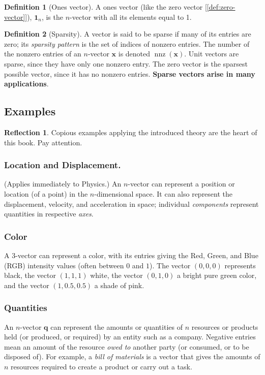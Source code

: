 \documentclass[11pt]{book}
\theoremstyle{definition}
\newtheorem{definition}{Definition}
\theoremstyle{plain}
\theoremstyle{problemstyle}
\theoremstyle{remark}
\theoremstyle{definition}
\newtheorem{reflection}{Reflection}
\DeclareMathOperator{\nnz}{nnz} %
\newcommand{\nnzx}{\nnz(\boldsymbol{x})}
\begin{document}
\begin{definition}[Ones vector]
    A ones vector (like the zero vector [\ref{def:zero-vector}]), $\boldsymbol{1}_n$, is the $n$-vector with all its elements equal to 1.
\end{definition}


\begin{definition}[Sparsity]
    A vector is said to be sparse if many of its entries are zero; its \emph{sparsity pattern} is the set of indices of nonzero entries. The number of the nonzero entries of an $n$-vector $\boldsymbol{x}$ is denoted $\nnzx$. Unit vectors are sparse, since they have only one nonzero entry. The zero vector is the sparsest possible vector, since it has no nonzero entries. \textbf{Sparse vectors arise in many applications}.
\end{definition}

\subsection*{Examples}
\begin{reflection}
    Copious examples applying the introduced theory are the heart of this book. Pay attention.
\end{reflection}

\subsubsection*{Location and Displacement.}
(Applies immediately to Physics.)
An $n$-vector can represent a position or location (of a point) in the $n$-dimensional space. It can also represent the displacement, velocity, and acceleration in space; individual \emph{components} represent quantities in respective \emph{axes}.


\subsubsection*{Color}
A $3$-vector can represent a color, with its entries giving the Red, Green, and Blue (RGB) intensity values (often between $0$ and $1$). The vector $(0,0,0)$ represents black, the vector $(1,1,1)$ white, the vector $(0,1,0)$ a bright pure green color, and the vector $(1,0.5,0.5)$ a shade of pink.

\subsubsection*{Quantities}
An $n$-vector $\boldsymbol{q}$ can represent the amounts or quantities of $n$ resources or products held (or produced, or required) by an entity such as a company. Negative entries mean an amount of the resource \emph{owed to} another party (or consumed, or to be disposed of). For example, a \emph{bill of materials} is a vector that gives the amounts of $n$ resources required to create a product or carry out a task.
\end{document}
